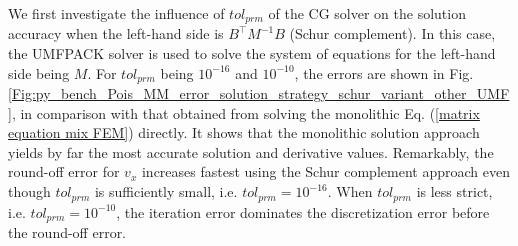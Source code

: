 \documentclass[review,3p]{elsarticle}
\begin{document}
% 
%  
We first investigate the influence of $tol_{prm}$ of the CG solver on the solution accuracy when the left-hand side is $B^{\top}M^{-1}B$ (Schur complement). In this case, the UMFPACK solver is used to solve the system of equations for the left-hand side being $M$.  
For $tol_{prm}$ being $10^{-16}$ and $10^{-10}$, the errors are shown in Fig. \ref{Fig:py_bench_Pois_MM_error_solution_strategy_schur_variant_other_UMF}, in comparison with that obtained from solving the monolithic Eq. (\ref{matrix equation mix FEM}) directly.
It shows that the monolithic solution approach yields by far the most accurate solution and derivative values.
Remarkably, the round-off error for $v_{x}$ increases fastest using the Schur complement approach even though $tol_{prm}$ is sufficiently small, i.e. $tol_{prm}=10^{-16}$.
When $tol_{prm}$ is less strict, i.e. $tol_{prm}=10^{-10}$, the iteration error dominates the discretization error before the round-off error.

\end{document}
